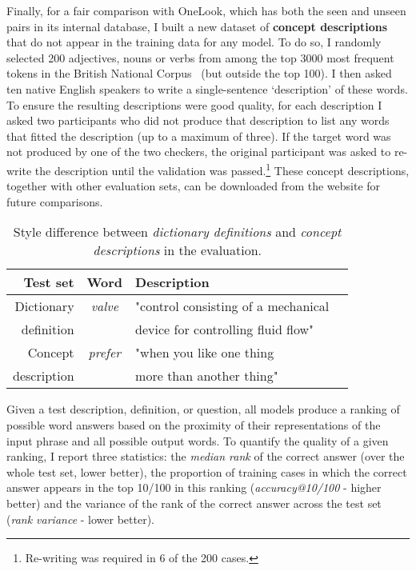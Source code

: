 Finally, for a fair comparison with OneLook, which has both the seen and unseen pairs in its internal database, I built a new dataset of {\bf concept descriptions} that do not appear in the training data for any model. To do so, I randomly selected 200 adjectives, nouns or verbs from among the top 3000 most frequent tokens in the British National Corpus~\citep{leech1994claws4} (but outside the top 100). I then asked ten native English speakers to write a single-sentence `description' of these words. To ensure the resulting descriptions were good quality, for each description I asked two participants who did not produce that description to list any words that fitted the description (up to a maximum of three). If the target word was not produced by one of the two checkers, the original participant was asked to re-write the description until the validation was passed.\footnote{Re-writing was required in 6 of the 200 cases.} These concept descriptions, together with other evaluation sets, can be downloaded from the website for future comparisons.

\begin{table*}[ht]
  \centering 
\begin{tabular}{r|clr}
\bf Test set & \bf Word & \bf Description \\
\hline
\rule{0pt}{4ex} 
 Dictionary &   \emph{valve} & "control consisting of a mechanical   \\
definition  & & device for controlling fluid flow" \\ 
\rule{0pt}{5ex} 
Concept &   \emph{prefer} & "when you like one thing \\
description & & more than another thing" \\
\end{tabular}
\caption{Style difference between \emph{dictionary definitions} and \emph{concept descriptions} in the evaluation.}
\label{tb:tablename}
\end{table*}

Given a test description, definition, or question, all models produce a ranking of possible word answers based on the proximity of their representations of the input phrase and all possible output words. To quantify the quality of a given ranking, I report three statistics: the \emph{median rank} of the correct answer (over the whole test set, lower better), the proportion of training cases in which the correct answer appears in the top 10/100 in this ranking (\emph{accuracy@10/100} - higher better) and the variance of the rank of the correct answer across the test set (\emph{rank variance} - lower better). 

